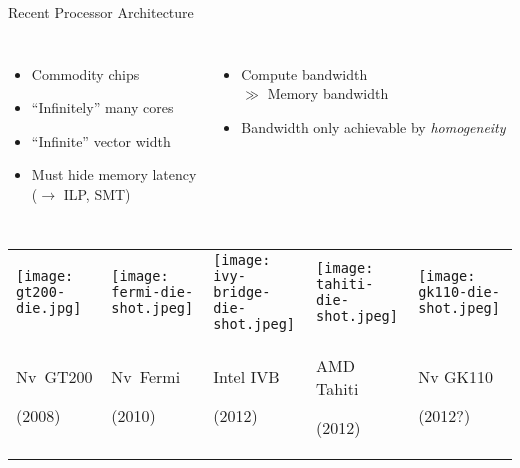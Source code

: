 \documentclass[english,compress]{beamer}
\begin{document}
\begin{frame}{Recent Processor Architecture}
  \begin{columns}
      \begin{itemize}
      \item Commodity chips
      \item ``Infinitely'' many cores
      \item ``Infinite'' vector width
      \item Must hide memory latency\\
        ($\rightarrow$ ILP, SMT)
      \end{itemize}
      \begin{itemize}
      \item Compute bandwidth\\
        \hfill $\gg$ Memory bandwidth
      \item Bandwidth only achievable by \emph{homogeneity}
      \end{itemize}
      \vspace*{3.5ex}
  \end{columns}
  \hspace*{-0.25\textwidth}
  \begin{tabular}{p{}p{}p{}p{}p{}}
  \texttt{[image: gt200-die.jpg]}
  &
  \texttt{[image: fermi-die-shot.jpeg]}
  &
  \centering
  \texttt{[image: ivy-bridge-die-shot.jpeg]}
  &
  \texttt{[image: tahiti-die-shot.jpeg]}
  &
  \texttt{[image: gk110-die-shot.jpeg]}
  \\
  \centering Nv~GT200\par(2008)
  &
  \centering Nv~Fermi\par(2010)
  &
  \centering Intel IVB\par(2012)
  &
  \centering AMD Tahiti \par(2012)
  &
  \centering Nv GK110\par(2012?)
  \end{tabular}
\end{frame}
\end{document}
